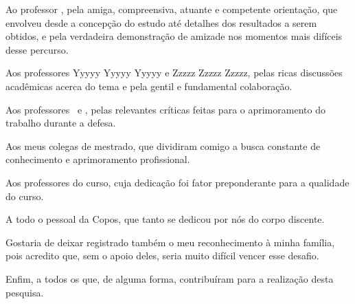 \begin{agradecimentos} %

Ao professor \imprimirorientador, pela amiga, compreensiva, atuante e competente orientação, que envolveu desde a concepção do estudo até detalhes dos resultados a serem obtidos, e pela verdadeira demonstração de amizade nos momentos mais difíceis desse percurso.

Aos professores Yyyyy Yyyyy Yyyyy e Zzzzz Zzzzz Zzzzz, pelas ricas discussões acadêmicas acerca do tema e pela gentil e fundamental colaboração.

Aos professores \imprimirmembroA\ e \imprimirmembroB, pelas relevantes críticas feitas para o aprimoramento do trabalho durante a defesa.

Aos meus colegas de mestrado, que dividiram comigo a busca constante de conhecimento e aprimoramento profissional.

Aos professores do curso, cuja dedicação foi fator preponderante para a qualidade do curso.

A todo o pessoal da Copos, que tanto se dedicou por nós do corpo discente.

Gostaria de deixar registrado também o meu reconhecimento à minha família, pois acredito que, sem o apoio deles, seria muito difícil vencer esse desafio.

Enfim, a todos os que, de alguma forma, contribuíram para a realização desta pesquisa.

\end{agradecimentos}
